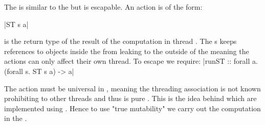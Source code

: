 \documentclass[thesis-solanki.tex]{subfiles}
\begin{document}

The  is similar to the  but is escapable. An  action  is of the 
form:

|ST s a|

 is the return type of the result of the computation in thread . The s keeps references to objects inside the 
 from leaking to the outside of the  meaning the actions can only affect their own 
thread. To escape we require:
|runST :: forall a. (forall s. ST s a) -> a|

The action  must be universal in , meaning the threading association is not known prohibiting to other threads and thus 
 is pure \cite{website:stmonadwiki, website:stmonadstackoverflow}. This is the idea behind  which are 
implemented using . Hence to use "true mutability" we carry out the computation in the .
\end{document}
